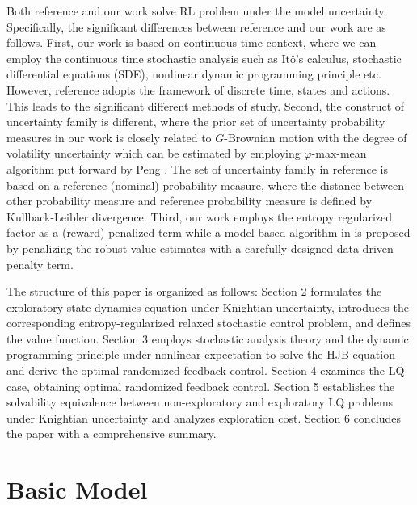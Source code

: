 \documentclass[onecolumn, journal]{IEEEtran} %
\begin{document}
	Both reference \cite{shi2024distributionally} and our work solve RL problem under the model uncertainty. Specifically, the significant differences between reference \cite{shi2024distributionally} and our work are as follows. First, our work is based on continuous time context, where we can employ the continuous time stochastic analysis such as It\^o's calculus, stochastic differential equations (SDE), nonlinear dynamic programming principle etc. However, reference \cite{shi2024distributionally} adopts the framework of discrete time, states and actions. This leads to the significant different methods of study. Second, the construct of uncertainty family is different, where the prior set of uncertainty probability measures in our work is closely related to $G$-Brownian motion with the degree of volatility uncertainty which can be estimated by employing $\varphi$-max-mean algorithm put forward by Peng \cite{peng2017}. The set of uncertainty family in reference \cite{shi2024distributionally} is based on a reference (nominal) probability measure, where the distance between other probability measure and reference probability measure is defined by Kullback-Leibler divergence. Third, our work employs the entropy regularized factor as a (reward) penalized term while a model-based algorithm in \cite{shi2024distributionally} is proposed by penalizing the robust value estimates with a carefully designed data-driven penalty term.
	
	The structure of this paper is organized as follows: Section 2 formulates the exploratory state dynamics equation under Knightian uncertainty, introduces the corresponding entropy-regularized relaxed stochastic control problem, and defines the value function. Section 3 employs stochastic analysis theory and the dynamic programming principle under nonlinear expectation to solve the HJB equation and derive the optimal randomized feedback control. Section 4 examines the LQ case, obtaining optimal randomized feedback control. Section 5 establishes the solvability equivalence between non-exploratory and exploratory LQ problems under Knightian uncertainty and analyzes exploration cost. Section 6 concludes the paper with a comprehensive summary.
	
	\section{Basic Model}
\end{document}
